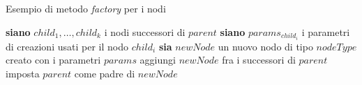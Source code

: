 
\begin{algorithm}
\caption{Esempio di metodo \emph{factory} per i nodi}\label{alg:builder-factory}
\begin{algorithmic}
\State \textbf{siano} $child_1,\dots,child_k$ i nodi successori di $parent$
	\State \textbf{siano} $params_{child_i}$ i parametri di creazioni usati per il nodo $child_i$
		\State {}
	\EndIf
\EndFor
\State \textbf{sia} $newNode$ un nuovo nodo di tipo $nodeType$ creato con i parametri $params$
\State aggiungi $newNode$ fra i successori di $parent$
\State imposta $parent$ come padre di $newNode$
\State {}
\EndFunction
\end{algorithmic}
\end{algorithm}
